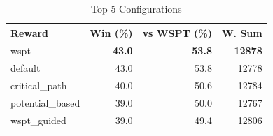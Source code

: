 \begin{table}[htbp]%
\centering%
\begin{tabular}{lrrr}%
\toprule%
\textbf{Reward}&\textbf{Win (\%)}&\textbf{vs WSPT (\%)}&\textbf{W. Sum}\\%
\midrule%
wspt&\textbf{43.0}&\textbf{53.8}&\textbf{12878}\\%
default&43.0&53.8&12778\\%
critical_path&40.0&50.6&12784\\%
potential_based&39.0&50.0&12767\\%
wspt_guided&39.0&49.4&12806\\%
\bottomrule%
\end{tabular}%
\caption{Top 5 Configurations}%
\label{tab:summary}%
\end{table}